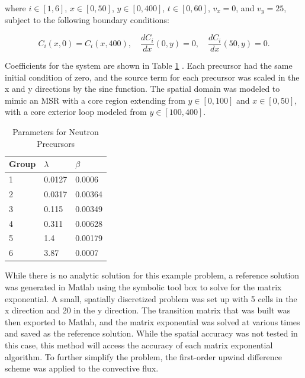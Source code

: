 \noindent where $i \in [1,6]$, $x \in [0, 50]$, $y \in [0, 400]$, $t \in [0, 60]$, $v_{x} = 0$, and $v_{y} = 25$, subject to the following boundary conditions:

\begin{equation}
    C_{i}(x,0) = C_{i}(x,400), \quad \frac{dC_{i}}{dx}(0,y) = 0, \quad \frac{dC_{i}}{dx}(50, y) = 0.
\end{equation}

Coefficients for the system are shown in Table \ref{tab:precursorCoeffs} \cite{ott1985}. 
Each precursor had the same initial condition of zero, and the source term for each precursor was scaled in the x and y directions by the sine function. The spatial domain was modeled to mimic an MSR with a core region extending from $y \in [0,100]$ and $x \in [0,50]$, with a core exterior loop modeled from $y \in [100, 400]$. 

\begin{table}[h!]
   \caption{\label{tab:precursorCoeffs} Parameters for Neutron Precursors}
   \centering
   \begin{tabular}{lll}
   \hline
   Group & $\lambda$ & $\beta$ \\
   \hline
   1 & 0.0127 & 0.0006 \\
   2 & 0.0317 & 0.00364 \\
   3 & 0.115 & 0.00349 \\
   4 & 0.311& 0.00628 \\
   5 & 1.4 & 0.00179\\
   6 & 3.87 & 0.0007 \\
   \hline
   \end{tabular}
\end{table}     

While there is no analytic solution for this example problem, a reference solution was generated in Matlab using the symbolic tool box to solve for the matrix exponential. A small, spatially discretized problem was set up with 5 cells in the x direction and 20 in the y direction. The transition matrix that was built was then exported to Matlab, and the matrix exponential was solved at various times and saved as the reference solution. While the spatial accuracy was not tested in this case, this method will access the accuracy of each matrix exponential algorithm. To further simplify the problem, the first-order upwind difference scheme was applied to the convective flux.

